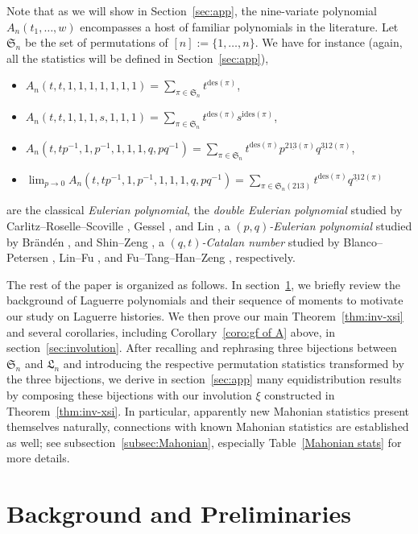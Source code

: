 \documentclass[12pt]{amsart}
\numberwithin{equation}{section}
\theoremstyle{plain}
\theoremstyle{definition}
\def\SS{\mathfrak{S}}
\def\LH{\mathfrak{L}}
\def\des{\mathrm{des}}
\def\ides{\mathrm{ides}}
\def\pprs{\mathrm{2\underline{13}}}
\def\pp31-2{\mathrm{\underline{31}2}}
\begin{document}
Note that as we will show in Section~\ref{sec:app}, the nine-variate polynomial $A_n(t_1,\ldots,w)$ encompasses a host of familiar polynomials in the literature. Let $\SS_n$ be the set of permutations of $[n]:=\{1,\ldots,n\}$. We have for instance (again, all the statistics will be defined in Section~\ref{sec:app}),
\begin{itemize}
  \item $A_n(t,t,1,1,1,1,1,1,1)=\sum_{\pi\in\SS_n}t^{\des(\pi)}$,
  \item $A_n(t,t,1,1,1,s,1,1,1)=\sum_{\pi\in\SS_n}t^{\des(\pi)}s^{\ides(\pi)}$,
  \item $A_n(t,tp^{-1},1,p^{-1},1,1,1,q,pq^{-1})=\sum_{\pi\in\SS_n}t^{\des(\pi)}p^{\pprs(\pi)}q^{\pp31-2(\pi)}$,
  \item $\lim_{p\rightarrow 0}A_n(t,tp^{-1},1,p^{-1},1,1,1,q,pq^{-1})=\sum_{\pi\in\SS_n(213)}t^{\des(\pi)}q^{\pp31-2(\pi)}$
\end{itemize}
are the classical {\it Eulerian polynomial}, the {\it double Eulerian polynomial} studied by Carlitz--Roselle--Scoville \cite{CRS}, Gessel \cite{Bra08,Bra15}, and Lin \cite{Lin}, a {\it $(p,q)$-Eulerian polynomial} studied by Br\"and\'en \cite{Bra08}, and Shin--Zeng \cite{SZ12}, a {\it $(q,t)$-Catalan number} studied by Blanco--Petersen \cite{BP}, Lin--Fu \cite{LF}, and Fu--Tang--Han--Zeng \cite{FTHZ}, respectively.

The rest of the paper is organized as follows. In section~\ref{sec:Preliminaries}, we briefly review the background of Laguerre polynomials and their sequence of moments to motivate our study on Laguerre histories. We then prove our main Theorem~\ref{thm:inv-xsi} and several corollaries, including Corollary~\ref{coro:gf of A} above, in section~\ref{sec:involution}. After recalling and rephrasing three bijections between $\SS_n$ and $\LH_n$ and introducing the respective permutation statistics transformed by the three bijections, we derive in section~\ref{sec:app} many equidistribution results by composing these bijections with our involution $\xi$ constructed in Theorem~\ref{thm:inv-xsi}. In particular, apparently new Mahonian statistics present themselves naturally, connections with known Mahonian statistics are established as well; see subsection~\ref{subsec:Mahonian}, especially Table~\ref{Mahonian stats} for more details.




\section{Background and Preliminaries}\label{sec:Preliminaries}
\end{document}
